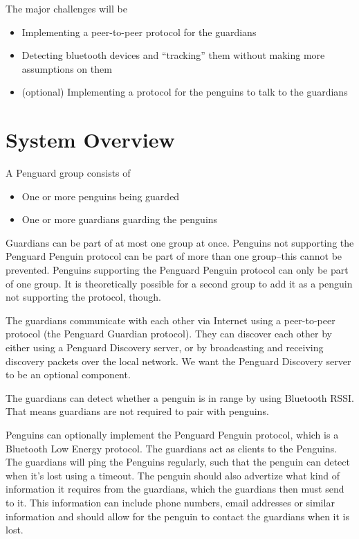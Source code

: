 \documentclass{report}
\begin{document}
The major challenges will be

\begin{itemize}
    \item Implementing a peer-to-peer protocol for the guardians
    \item Detecting bluetooth devices and ``tracking'' them without making more assumptions on them
    \item (optional) Implementing a protocol for the penguins to talk to the guardians
\end{itemize}

\section{System Overview}

A Penguard group consists of

\begin{itemize}
    \item One or more penguins being guarded
    \item One or more guardians guarding the penguins
\end{itemize}

Guardians can be part of at most one group at once. Penguins not supporting the Penguard Penguin protocol can be part of more than one group--this cannot be prevented. Penguins supporting the Penguard Penguin protocol can only be part of one group. It is theoretically possible for a second group to add it as a penguin not supporting the protocol, though.

The guardians communicate with each other via Internet using a peer-to-peer protocol (the Penguard Guardian protocol). They can discover each other by either using a Penguard Discovery server, or by broadcasting and receiving discovery packets over the local network. We want the Penguard Discovery server to be an optional component.

The guardians can detect whether a penguin is in range by using Bluetooth RSSI. That means guardians are not required to pair with penguins. 

Penguins can optionally implement the Penguard Penguin protocol, which is a Bluetooth Low Energy protocol. The guardians act as clients to the Penguins. The guardians will ping the Penguins regularly, such that the penguin can detect when it's lost using a timeout. The penguin should also advertize what kind of information it requires from the guardians, which the guardians then must send to it. This information can include phone numbers, email addresses or similar information and should allow for the penguin to contact the guardians when it is lost.
\end{document}

